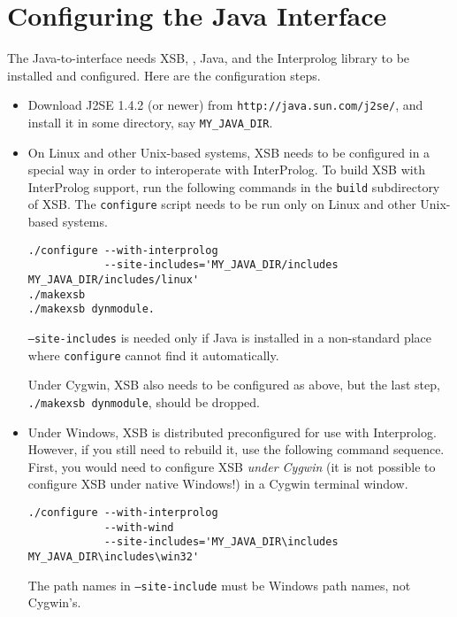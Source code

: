\section{Configuring the Java Interface}
The Java-to-\FLORA interface needs XSB, \FLORA, Java, and the
Interprolog library to be installed and configured. Here are the
configuration steps.

\begin{itemize}
\item Download J2SE 1.4.2 (or newer) from
  {\tt http://java.sun.com/j2se/},
and install it in some directory, say {\tt MY\_JAVA\_DIR}.
\item On Linux and other Unix-based systems,
  XSB needs to be configured in a special way
in order to interoperate with InterProlog. To build XSB with
InterProlog support, run the following commands in the {\tt build}
subdirectory of XSB.
The {\tt configure} script needs to be run only on Linux and
other Unix-based systems.
\begin{verbatim}
./configure --with-interprolog
            --site-includes='MY_JAVA_DIR/includes MY_JAVA_DIR/includes/linux'
./makexsb
./makexsb dynmodule.
\end{verbatim}
{\tt --site-includes} is needed only if Java is installed in a non-standard
place where {\tt configure} cannot find it automatically.

Under Cygwin, XSB also needs to be configured as above, but the last step,
{\tt ./makexsb dynmodule}, should be dropped.

\item Under Windows, XSB is distributed preconfigured for use with
  Interprolog. However, if you still need to rebuild it, use the following
  command sequence. First, you would need to configure XSB \emph{under
    Cygwin} (it is not possible to configure XSB under native Windows!) in a
  Cygwin terminal window.  
\begin{verbatim}
./configure --with-interprolog
            --with-wind
            --site-includes='MY_JAVA_DIR\includes MY_JAVA_DIR\includes\win32'
\end{verbatim}
  The path names in {\tt --site-include} must be Windows path names, not
  Cygwin's.


\end{itemize}
